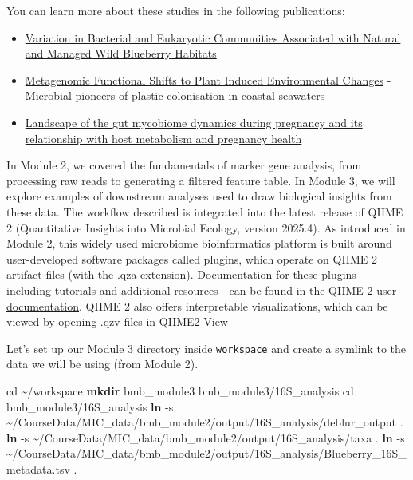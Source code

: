 \documentclass[
]{book}
\newenvironment{Shaded}{\begin{snugshade}}{\end{snugshade}}
\newcommand{\AttributeTok}[1]{\textcolor[rgb]{0.13,0.29,0.53}{#1}}
\newcommand{\BuiltInTok}[1]{#1}
\newcommand{\FunctionTok}[1]{\textcolor[rgb]{0.13,0.29,0.53}{\textbf{#1}}}
\newcommand{\NormalTok}[1]{#1}
\providecommand{\tightlist}{%
  \setlength{\itemsep}{0pt}\setlength{\parskip}{0pt}}
\begin{document}
You can learn more about these studies in the following publications:

\begin{itemize}
\tightlist
\item
  \href{https://apsjournals.apsnet.org/doi/10.1094/PBIOMES-03-17-0012-R}{Variation in Bacterial and Eukaryotic Communities Associated with Natural and Managed Wild Blueberry Habitats}
\item
  \href{https://www.frontiersin.org/articles/10.3389/fmicb.2019.01682/full\#B50}{Metagenomic Functional Shifts to Plant Induced Environmental Changes}
  -\href{https://www.sciencedirect.com/science/article/pii/S0025326X22003836\#s0050}{Microbial pioneers of plastic colonisation in coastal seawaters}
\item
  \href{https://gut.bmj.com/content/73/8/1302.long}{Landscape of the gut mycobiome dynamics during pregnancy and its relationship with host metabolism and pregnancy health}
\end{itemize}

In Module 2, we covered the fundamentals of marker gene analysis, from processing raw reads to generating a filtered feature table. In Module 3, we will explore examples of downstream analyses used to draw biological insights from these data. The workflow described is integrated into the latest release of QIIME 2 (Quantitative Insights into Microbial Ecology, version 2025.4). As introduced in Module 2, this widely used microbiome bioinformatics platform is built around user-developed software packages called plugins, which operate on QIIME 2 artifact files (with the .qza extension). Documentation for these plugins---including tutorials and additional resources---can be found in the \href{https://amplicon-docs.qiime2.org/en/latest/}{QIIME 2 user documentation}. QIIME 2 also offers interpretable visualizations, which can be viewed by opening .qzv files in \href{https://view.qiime2.org/}{QIIME2 View}

Let's set up our Module 3 directory inside \texttt{workspace} and create a symlink to the data we will be using (from Module 2).

\begin{Shaded}
\begin{Highlighting}[]
\BuiltInTok{cd}\NormalTok{ \textasciitilde{}/workspace}
\FunctionTok{mkdir}\NormalTok{ bmb\_module3 bmb\_module3/16S\_analysis}
\BuiltInTok{cd}\NormalTok{ bmb\_module3/16S\_analysis}
\FunctionTok{ln} \AttributeTok{{-}s}\NormalTok{ \textasciitilde{}/CourseData/MIC\_data/bmb\_module2/output/16S\_analysis/deblur\_output .}
\FunctionTok{ln} \AttributeTok{{-}s}\NormalTok{ \textasciitilde{}/CourseData/MIC\_data/bmb\_module2/output/16S\_analysis/taxa .}
\FunctionTok{ln} \AttributeTok{{-}s}\NormalTok{ \textasciitilde{}/CourseData/MIC\_data/bmb\_module2/output/16S\_analysis/Blueberry\_16S\_metadata.tsv .}
\end{Highlighting}
\end{Shaded}
\end{document}
